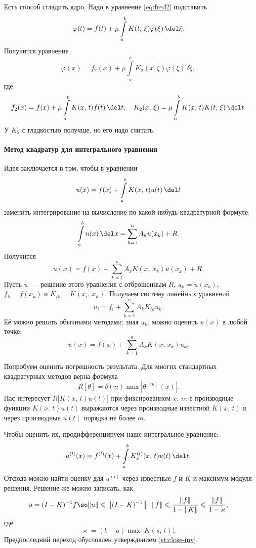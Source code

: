 \documentclass{trlnotes}
\begin{document}
    \begin{rem}
        Есть способ сгладить ядро. Надо в уравнение \ref{eq:fred2} подставить
        \[
            \varphi(t) = f(t) + \mu\int\limits_a^b K(t, \, \xi) \varphi(\xi) \, \del \xi.
        \]
        Получится уравнение
        \[
            \varphi(x) = f_2(x) + \mu\int\limits_a^b  K_2(x, \xi) \varphi(\xi) \, \delta \xi,
        \]
        где
        \[
            f_2(x) = f(x) + \mu \int\limits_a^b K(x, \, t) f(t) \, \del t, \quad K_2(x, \, \xi) = \mu \int\limits_a^b K(x, \, t) K(t, \, \xi) \, \del t. 
        \]
        У $K_2$ с гладкостью получше, но его надо считать.
    \end{rem}

    \paragraph{Метод квадратур для интегрального уравнения}

    Идея заключается в том, чтобы в уравнении
    \[
        u(x) = f(x) + \int\limits_a^b K(x, \, t) u(t)\, \del t
    \]
    заменить интегрирование на вычисление по какой-нибудь квадратурной формуле:
    \[
        \int\limits_a^b u (x) \, \del x = \sum\limits_{k = 1}^n A_k u(x_k) + R.
    \]
    Получится
    \[
        u(x) = f(x) + \sum\limits_{k = 1}^n A_k K(x, \, x_k) u(x_k) + R.
    \]
    Пусть $\tilde{u}$~--- решение этого уравнения с отброшенным $R$, $u_k = \tilde{u}(x_k)$, $f_k = f(x_k)$ и $K_{ik} = K(x_i, \, x_k)$.
    Получаем систему линейных уравнений
    \[
        u_i = f_i + \sum\limits_{k = 1}^n A_k K_{ik} u_k.
    \]
    Её можно решить обычными методами; зная $u_k$, можно оценить $u(x)$ в любой точке:
    \[
        u(x) = f(x) + \sum\limits_{k = 1}^n A_k K(x, \, x_k) u_k.
    \]

    Попробуем оценить погрешность результата. Для многих стандартных квадратурных методов верна формула
    \[
        R[\theta] = \delta(n) \max |\theta^{(m)}(x)|.
    \]
    Нас интересует $R\big[K(x, \, t)u(t)\big]$ при фиксированном $x$. $m$-е производные функции $K(x, \, t)u(t)$ выражаются через производные известной $K(x, \, t)$ и через производные $u(t)$ порядка не более $m$.

    Чтобы оценить их, продифференцируем наше интегральное уравнение:
    \[
        u^{(l)}(x) = f^{(l)}(x) + \int\limits_a^b K^{(l)}_x(x, \, t) u(t)\, \del t.
    \]
    Отсюда можно найти оценку для $u^{(l)}$ через известные $f$ и $K$ и максимум модуля решения. Решение же можно записать, как
    \[
        u = (I - K)^{-1} f \so \|u\| \leqslant \big\|(I - K)^{-1}\big\| \cdot \|f\| \leqslant \dfrac{\|f\|}{1 - \|K\|} \leqslant \dfrac{\|f\|}{1 - \varkappa},
    \]
    где 
    \[
        \varkappa = (b - a) \max \big|K(s, \, t)\big|.
    \]
    Предпоследний переход обусловлен утверждением \ref{st:close-inv}. 
\end{document}
